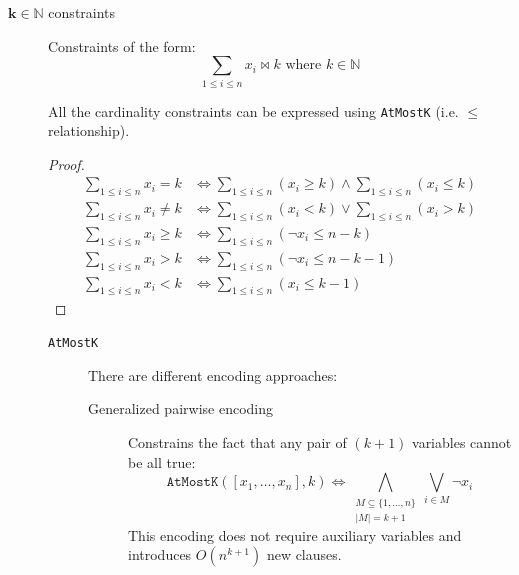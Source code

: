\begin{description}
    \item[$\mathbf{k \in \mathbb{N}}$ constraints] 
        Constraints of the form:
        \[ \sum_{1 \leq i \leq n} x_i \bowtie k \text{ where } k \in \mathbb{N} \]

        \begin{theorem}
            All the cardinality constraints can be expressed using \texttt{AtMostK} (i.e. $\leq$ relationship).
            \begin{proof}
                \[
                    \begin{split}
                        \sum_{1 \leq i \leq n} x_i = k &\iff \sum_{1 \leq i \leq n} (x_i \geq k ) \land \sum_{1 \leq i \leq n} (x_i \leq k) \\
                        \sum_{1 \leq i \leq n} x_i \neq k &\iff \sum_{1 \leq i \leq n} (x_i < k) \vee \sum_{1 \leq i \leq n} (x_i > k) \\
                        \sum_{1 \leq i \leq n} x_i \geq k &\iff \sum_{1 \leq i \leq n} (\lnot x_i \leq n-k) \\
                        \sum_{1 \leq i \leq n} x_i > k &\iff \sum_{1 \leq i \leq n} (\lnot x_i \leq n-k-1) \\
                        \sum_{1 \leq i \leq n} x_i < k &\iff \sum_{1 \leq i \leq n} (x_i \leq k-1)
                    \end{split}
                \]
            \end{proof}
        \end{theorem}

        \begin{description}
            \item[\texttt{AtMostK}] 
                There are different encoding approaches:
                \begin{description}
                    \item[Generalized pairwise encoding] 
                        Constrains the fact that any pair of $(k+1)$ variables cannot be all true:
                        \[ 
                            \texttt{AtMostK}([x_1, \dots, x_n], k) \iff \bigwedge_{\substack{ M \subseteq \{ 1, \dots, n \}\\\vert M \vert = k+1 }} \bigvee_{i \in M} \lnot x_i
                        \]
                        This encoding does not require auxiliary variables and introduces $O(n^{k+1})$ new clauses.
                    

\end{description}
\end{description}
\end{description}
